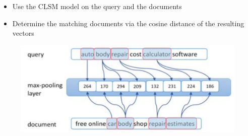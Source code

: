 \begin{multicols*}{3}





\setlength{\PlakatBeschreibungBeispielbildBeschnitt}{50cm} %

\columnbreak

\begin{itemize}
	\item Use the CLSM model on the query and the documents
	\item Determine the matching documents via the cosine distance of the resulting vectors
\end{itemize}

\vspace{5mm}
\begin{figure}

	\includegraphics[width = \textwidth]{./SemanticMatching.png}\\


\end{figure}
\end{multicols*}
